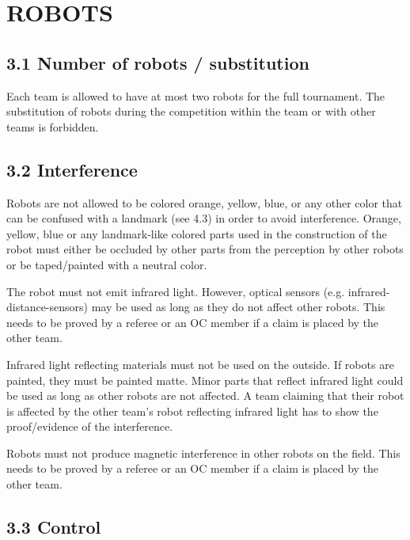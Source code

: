 \documentclass{article}
\begin{document}
\section{ROBOTS\label{ref-018}}

\subsection{3.1 Number of robots / substitution \label{ref-019}}

Each team is allowed to have at most two robots \textcolor{color-5}{for the full} \textcolor{color-5}{tournament}. The substitution of robots during the competition within the team or with other teams is forbidden.

\subsection{3.2 Interference \label{ref-020}}

Robots are not allowed to be colored orange, yellow, blue\textcolor{color-5}{, or any other color that can be confused with a landmark (see 4.3)} in order to avoid interference. Orange, yellow, blue \textcolor{color-5}{or any landmark-like colored} parts used in the construction of the robot must either be occluded by other parts from the perception by other robots or be taped/painted with a neutral color. 

The robot must not emit infrared light. However, optical sensors (e.g. infrared-distance-sensors) may be used as long as they do not affect other robots. This needs to be proved by a referee or an OC member if a claim is placed by the other team. 

Infrared light reflecting materials must not be used on the outside. If robots are painted, they must be painted matte. Minor parts that reflect infrared light could be used as long as other robots are not affected. A team claiming that their robot is affected by the other team's robot reflecting infrared light has to show the proof/evidence of the interference.

Robots must not produce magnetic interference in other robots on the field. This needs to be proved by a referee or an OC member if a claim is placed by the other team.

\subsection{3.3 Control \label{ref-021}}
\end{document}
